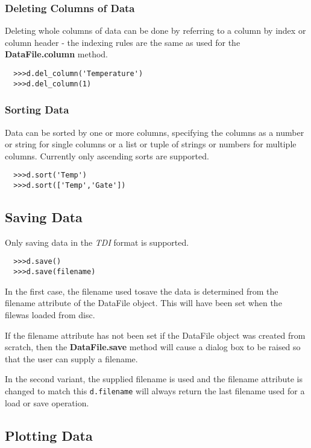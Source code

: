 \documentclass[a4paper,11pt]{scrartcl}
\begin{document}
\subsubsection{Deleting Columns of Data}

Deleting whole columns of data can be done by referring to a column by index or column header - the indexing rules are the same as used for the \textbf{DataFile.column} method.

\begin{verbatim}
  >>>d.del_column('Temperature')
  >>>d.del_column(1)
\end{verbatim}

\subsubsection{Sorting Data}

Data can be sorted by one or more columns, specifying the columns as a number or string for single columns or a list or tuple of strings or numbers for multiple columns. Currently only ascending sorts are supported.

\begin{verbatim}
  >>>d.sort('Temp')
  >>>d.sort(['Temp','Gate'])
\end{verbatim}

\subsection{Saving Data}

Only saving data in the \textit{TDI} format is supported.

\begin{verbatim}
  >>>d.save()
  >>>d.save(filename)
\end{verbatim}

In the first case, the filename used tosave the data is determined from the filename attribute of the DataFile object. This will have been set when the filewas loaded from disc.

If the filename attribute has not been set \eg if the DataFile object was created from scratch, then the \textbf{DataFile.save} method will cause a dialog box to be raised so that the user can supply a filename.

In the second variant, the supplied filename is used and the filename attribute is changed to match this \ie \verb#d.filename# will always return the last filename used for a load or save operation.

\subsection{Plotting Data}
\end{document}
